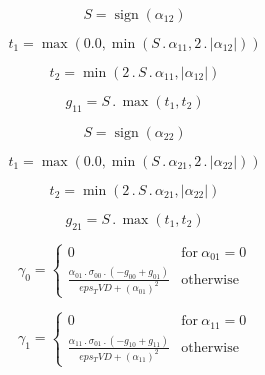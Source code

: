 \documentclass{article}
\begin{document}
\begin{dmath}S = \operatorname{sign}{\left (\alpha_{12} \right )}\end{dmath}

\begin{dmath}t_{1} = \max\left(0.0, \min\left(S \,.\, \alpha_{11}, 2 \,.\, \left|{\alpha_{12}}\right|\right)\right)\end{dmath}

\begin{dmath}t_{2} = \min\left(2 \,.\, S \,.\, \alpha_{11}, \left|{\alpha_{12}}\right|\right)\end{dmath}

\begin{dmath}g_{11} = S \,.\, \max\left(t_{1}, t_{2}\right)\end{dmath}

\begin{dmath}S = \operatorname{sign}{\left (\alpha_{22} \right )}\end{dmath}

\begin{dmath}t_{1} = \max\left(0.0, \min\left(S \,.\, \alpha_{21}, 2 \,.\, \left|{\alpha_{22}}\right|\right)\right)\end{dmath}

\begin{dmath}t_{2} = \min\left(2 \,.\, S \,.\, \alpha_{21}, \left|{\alpha_{22}}\right|\right)\end{dmath}

\begin{dmath}g_{21} = S \,.\, \max\left(t_{1}, t_{2}\right)\end{dmath}

\begin{dmath}\gamma_{0} = \begin{cases} 0 & \text{for}\: \alpha_{01} = 0 \\\frac{\alpha_{01} \,.\, \sigma_{0 0} \,.\, \left(- g_{00} + g_{01}\right)}{eps_TVD + \left(\alpha_{01} \right)^{2}} & \text{otherwise} \end{cases}\end{dmath}

\begin{dmath}\gamma_{1} = \begin{cases} 0 & \text{for}\: \alpha_{11} = 0 \\\frac{\alpha_{11} \,.\, \sigma_{0 1} \,.\, \left(- g_{10} + g_{11}\right)}{eps_TVD + \left(\alpha_{11} \right)^{2}} & \text{otherwise} \end{cases}\end{dmath}
\end{document}

